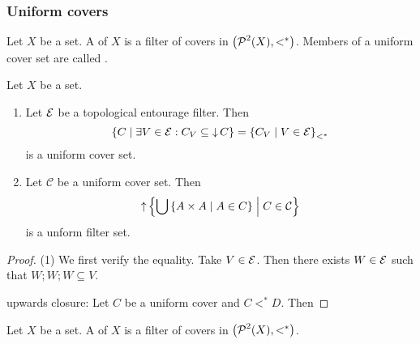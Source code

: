 \subsubsection{Uniform covers}
\begin{definition}
Let $X$ be a set. A  of $X$ is a filter of covers in $\left( \operatorname{\mathcal{P}}^2(X), <^* \right)$. Members of a uniform cover set are called .
\end{definition}

\begin{proposition}
Let $X$ be a set.
\begin{enumerate}
\item Let $\operatorname{\mathcal{E}}$ be a topological entourage filter. Then
\[ \left\{ C \;\middle|\; \exists V\in\operatorname{\mathcal{E}}: C_V\subseteq \operatorname{\downarrow} C \right\} = \left\{ C_V \;\middle|\; V\in\operatorname{\mathcal{E}} \right\}_{<^*} \]
is a uniform cover set.
\item Let $\mathcal{C}$ be a uniform cover set. Then
\[ \operatorname{\uparrow} \left\{ \bigcup\left\{ A\times A \;\middle|\; A\in C \right\} \;\middle|\; C\in\mathcal{C} \right\} \]
is a unform filter set.
\end{enumerate}
\end{proposition}
\begin{proof}
(1) We first verify the equality. Take $V\in \operatorname{\mathcal{E}}$. Then there exists $W\in \operatorname{\mathcal{E}}$ such that $W;W;W\subseteq V$.


upwards closure: Let $C$ be a uniform cover and $C <^* D$. Then 
\end{proof}



\begin{definition}
Let $X$ be a set. A  of $X$ is a filter of covers in $\left( \operatorname{\mathcal{P}}^2(X), <^* \right)$.
\end{definition}